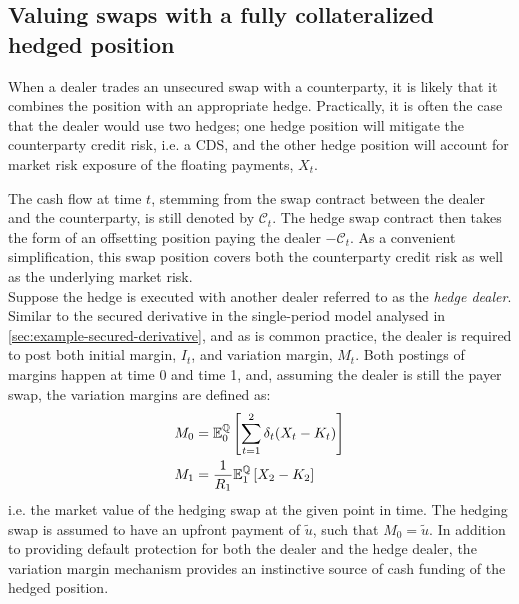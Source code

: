 \documentclass[main.tex]{subfiles}
\begin{document}
    \subsection{Valuing swaps with a fully collateralized hedged position}
        When a dealer trades an unsecured swap with a counterparty,
        it is likely that it combines the position with an appropriate hedge.
        Practically, it is often the case that the dealer would use two hedges;
        one hedge position will mitigate the counterparty credit risk, i.e. a CDS,
        and the other hedge position will account for market risk exposure of the floating payments, $X_t$.
        
        The cash flow at time $t$, stemming from the swap contract between the dealer and the counterparty,
        is still denoted by $\mathcal{C}_t$.
        The hedge swap contract then takes the form of an offsetting position paying the dealer $-\mathcal{C}_t$.
        As a convenient simplification, this swap position covers both the counterparty credit risk as well as the underlying market risk.
        \\
        Suppose the hedge is executed with another dealer referred to as the \textit{hedge dealer}.
        Similar to the secured derivative in the single-period model analysed in \cref{sec:example-secured-derivative},
        and as is common practice,
        the dealer is required to post both initial margin, $I_{t}$, and variation margin, $M_{t}$.
        Both postings of margins happen at time 0 and time 1,
        and, assuming the dealer is still the payer swap,
        the variation margins are defined as:
        \begin{align}
            M_0 &= \mathbb{E}_{0}^{\mathbb{Q}}\left[\sum_{t=1}^{2}\delta_t (X_t - K_t)\right]
            \\
            M_1 &= \frac{1}{R_1}\mathbb{E}_{1}^{\mathbb{Q}}\left[X_2 - K_2\right] 
        \end{align}
        i.e. the market value of the hedging swap at the given point in time.
        The hedging swap is assumed to have an upfront payment of $\tilde{u}$, such that $M_0 = \tilde{u}$.
        In addition to providing default protection for both the dealer and the hedge dealer,
        the variation margin mechanism provides an instinctive source of cash funding of the hedged position. 
\end{document}
